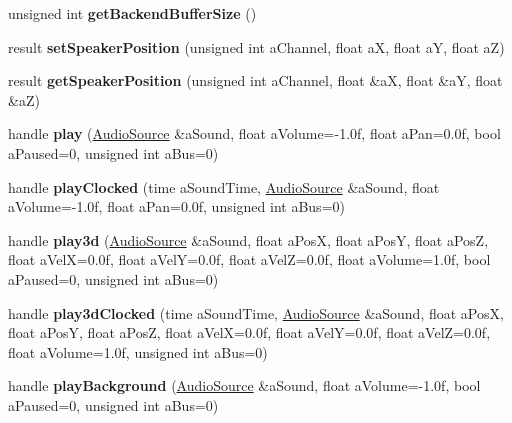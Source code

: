 \begin{DoxyCompactItemize}
unsigned int {\bfseries get\+Backend\+Buffer\+Size} ()
\item 
\mbox{\label{class_so_loud_1_1_soloud_a1835694c29ac4ce0ea9e4bcaf7ef3373}} 
result {\bfseries set\+Speaker\+Position} (unsigned int a\+Channel, float aX, float aY, float aZ)
\item 
\mbox{\label{class_so_loud_1_1_soloud_a4f29c0a7ae25dfcc8dd184bb0cd80fef}} 
result {\bfseries get\+Speaker\+Position} (unsigned int a\+Channel, float \&aX, float \&aY, float \&aZ)
\item 
\mbox{\label{class_so_loud_1_1_soloud_abd8f5c6c7f1ee00ed340d09302448a9a}} 
handle {\bfseries play} (\mbox{\hyperlink{class_so_loud_1_1_audio_source}{Audio\+Source}} \&a\+Sound, float a\+Volume=-\/1.\+0f, float a\+Pan=0.\+0f, bool a\+Paused=0, unsigned int a\+Bus=0)
\item 
\mbox{\label{class_so_loud_1_1_soloud_a371446b6bf287a9e10514dd9b113111b}} 
handle {\bfseries play\+Clocked} (time a\+Sound\+Time, \mbox{\hyperlink{class_so_loud_1_1_audio_source}{Audio\+Source}} \&a\+Sound, float a\+Volume=-\/1.\+0f, float a\+Pan=0.\+0f, unsigned int a\+Bus=0)
\item 
\mbox{\label{class_so_loud_1_1_soloud_aec0c42f795c8213606ce885c45d9e4e8}} 
handle {\bfseries play3d} (\mbox{\hyperlink{class_so_loud_1_1_audio_source}{Audio\+Source}} \&a\+Sound, float a\+PosX, float a\+PosY, float a\+PosZ, float a\+VelX=0.\+0f, float a\+Vel\+Y=0.\+0f, float a\+Vel\+Z=0.\+0f, float a\+Volume=1.\+0f, bool a\+Paused=0, unsigned int a\+Bus=0)
\item 
\mbox{\label{class_so_loud_1_1_soloud_a5d1e394c21dc42b8e6f0a1e6a827228c}} 
handle {\bfseries play3d\+Clocked} (time a\+Sound\+Time, \mbox{\hyperlink{class_so_loud_1_1_audio_source}{Audio\+Source}} \&a\+Sound, float a\+PosX, float a\+PosY, float a\+PosZ, float a\+VelX=0.\+0f, float a\+Vel\+Y=0.\+0f, float a\+Vel\+Z=0.\+0f, float a\+Volume=1.\+0f, unsigned int a\+Bus=0)
\item 
\mbox{\label{class_so_loud_1_1_soloud_a15cc3cf2e21f6ba82260460c8aff266b}} 
handle {\bfseries play\+Background} (\mbox{\hyperlink{class_so_loud_1_1_audio_source}{Audio\+Source}} \&a\+Sound, float a\+Volume=-\/1.\+0f, bool a\+Paused=0, unsigned int a\+Bus=0)

\end{DoxyCompactItemize}
